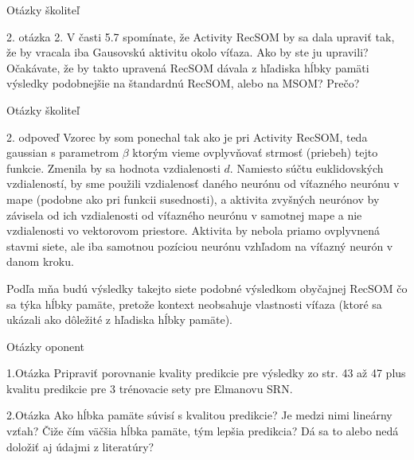 \documentclass[10pt]{beamer}
\begin{document}
\begin{frame}{Otázky školiteľ}
  \begin{block}{2. otázka}
    2. V časti 5.7 spomínate, že Activity RecSOM by sa dala upraviť tak, že by vracala iba Gausovskú aktivitu okolo víťaza. Ako by ste ju upravili? Očakávate, že by takto upravená RecSOM dávala z hľadiska hĺbky pamäti výsledky podobnejšie na štandardnú RecSOM, alebo na MSOM? Prečo?
  \end{block}
\end{frame}

\begin{frame}{Otázky školiteľ}
  \begin{block}{2. odpoveď}
    Vzorec by som ponechal tak ako je pri Activity RecSOM, 
    teda gaussian s parametrom $\beta$ ktorým vieme ovplyvňovať strmosť (priebeh) tejto funkcie.
    Zmenila by sa hodnota vzdialenosti $d$. 
    Namiesto súčtu euklidovských vzdialeností, by sme použili vzdialenosť 
    daného neurónu od víťazného neurónu v mape (podobne ako pri funkcii susednosti), 
    a aktivita zvyšných neurónov by závisela od ich vzdialenosti od víťazného neurónu v samotnej mape a nie vzdialenosti vo vektorovom priestore. 
    Aktivita by nebola priamo ovplyvnená stavmi siete, ale iba samotnou pozíciou neurónu vzhľadom na víťazný neurón v danom kroku. 

    Podľa mňa budú výsledky takejto siete podobné výsledkom obyčajnej RecSOM čo sa týka hĺbky pamäte, 
    pretože kontext neobsahuje vlastnosti víťaza (ktoré sa ukázali ako dôležité z hľadiska hĺbky pamäte).
    
 

  \end{block}
\end{frame}

\begin{frame}{Otázky oponent}
  
  \begin{block}{1.Otázka}
    Pripraviť porovnanie kvality predikcie pre výsledky zo str. 43 až 47 plus kvalitu predikcie pre 3 trénovacie sety pre Elmanovu SRN. 
  \end{block}

  \begin{block}{2.Otázka}
    Ako hĺbka pamäte súvisí s kvalitou predikcie? Je medzi nimi lineárny vzťah? Čiže čím väčšia hĺbka pamäte, tým lepšia predikcia? Dá sa to alebo nedá doložiť aj údajmi z literatúry?
  \end{block}


\end{frame}
\end{document}
